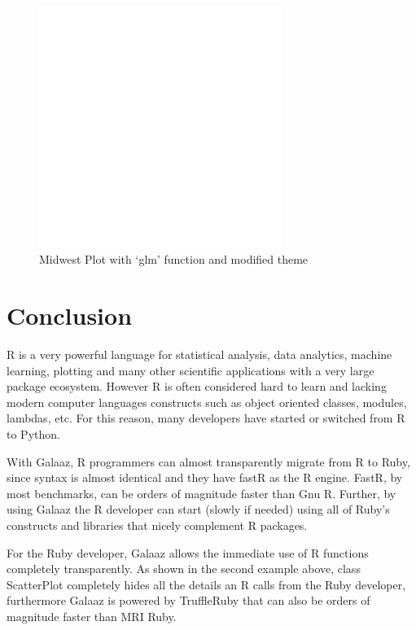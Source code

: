 \documentclass[11pt,]{article}
\begin{document}
\begin{figure}
\centering
\includegraphics[width=0.7\textwidth,height=\textheight]{scatter_plot.png}
\caption{Midwest Plot with `glm' function and modified theme}
\end{figure}

\hypertarget{conclusion}{%
\section{Conclusion}\label{conclusion}}

R is a very powerful language for statistical analysis, data analytics,
machine learning, plotting and many other scientific applications with a
very large package ecosystem. However R is often considered hard to
learn and lacking modern computer languages constructs such as object
oriented classes, modules, lambdas, etc. For this reason, many
developers have started or switched from R to Python.

With Galaaz, R programmers can almost transparently migrate from R to
Ruby, since syntax is almost identical and they have fastR as the R
engine. FastR, by most benchmarks, can be orders of magnitude faster
than Gnu R. Further, by using Galaaz the R developer can start (slowly
if needed) using all of Ruby's constructs and libraries that nicely
complement R packages.

For the Ruby developer, Galaaz allows the immediate use of R functions
completely transparently. As shown in the second example above, class
ScatterPlot completely hides all the details an R calls from the Ruby
developer, furthermore Galaaz is powered by TruffleRuby that can also be
orders of magnitude faster than MRI Ruby.
\end{document}
